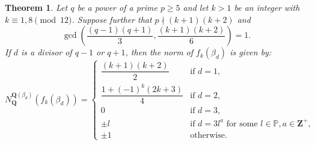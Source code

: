 \documentclass{amsart}
\newcommand{\Q}{\mathbf Q}
\newcommand{\Z}{\mathbf Z}
\numberwithin{equation}{section}
\theoremstyle{plain}
\newtheorem{theorem}{Theorem}
\theoremstyle{definition}
\begin{document}
\begin{theorem}\label{thm:A2normQ}
Let $q$ be a power of a prime $p\ge 5$ and let $k>1$ be an integer with $k\equiv1,8\pmod{12}$. Suppose further that $p\nmid(k+1)(k+2)$ and
$$\gcd\left(\frac{(q-1)(q+1)}{3}, \frac{(k+1)(k+2)}{6}\right)=1.$$
If $d$ is a divisor of $q-1$ or $q+1$, then the norm of $f_k(\beta_d)$ is given by:
$$
N_{\Q}^{\Q(\beta_d)}\left(f_k(\beta_d)\right) = 
\begin{cases}
	\dfrac{(k+1)(k+2)}{2} & \text{if } d = 1, \\
	\dfrac{1+(-1)^k(2k+3)}{4} & \text{if } d = 2, \\
	0 & \text{if } d = 3, \\
	\pm l & \text{if } d = 3l^a \text{ for some }l\in\mathbb{P}, a\in\Z^{+},\\
	\pm 1 & \text{otherwise}.
\end{cases}
$$
\end{theorem}
\end{document}
